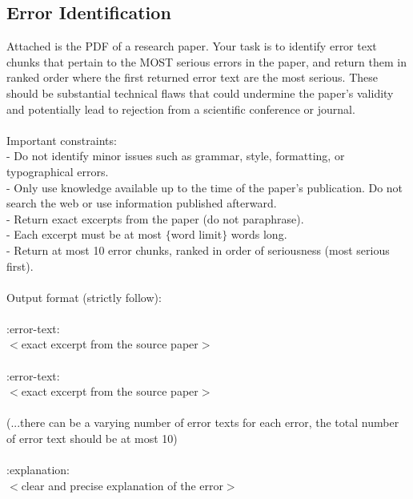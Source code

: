 \documentclass{article}
\begin{document}
\begin{appendix}
\subsection{Error Identification}
\begin{tcolorbox}
[breakable, colback=black!5!white,colframe=black!20!white,title=\textbf{\textcolor{black}{Error Identification Prompt}}]\label{appendix:error_identification}
\small
    Attached is the PDF of a research paper. Your task is to identify error text chunks that pertain to the MOST serious errors in the paper, and return them in ranked order where the first returned error text are the most serious. These should be substantial technical flaws that could undermine the paper's validity and potentially lead to rejection from a scientific conference or journal.\\
    \\
    Important constraints:\\
    - Do not identify minor issues such as grammar, style, formatting, or typographical errors.\\
    - Only use knowledge available up to the time of the paper's publication. Do not search the web or use information published afterward.\\
    - Return exact excerpts from the paper (do not paraphrase).\\
    - Each excerpt must be at most $\{$word limit$\}$ words long.\\
    - Return at most 10 error chunks, ranked in order of seriousness (most serious first).\\
    \\
    Output format (strictly follow):\\
    \\
    :error-text:\\
    $<$exact excerpt from the source paper$>$\\
    \\
    :error-text:\\
    $<$exact excerpt from the source paper$>$\\
    \\
    (...there can be a varying number of error texts for each error, the total number of error text should be at most 10)\\
    \\
    :explanation:\\
    $<$clear and precise explanation of the error$>$
\end{tcolorbox}


\end{appendix}
\end{document}
